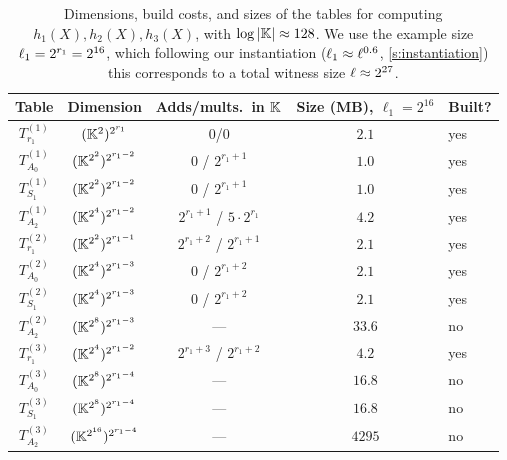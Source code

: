 \documentclass[11pt,letterpaper,usenames,dvipsnames]{article}
\begin{document}
\begin{table}[H]
    \centering
    \small
    \begin{tabular}{c|c|c|c|l}
        Table & Dimension & Adds/mults.\ in $\mathbb{K}$ & Size (MB), $\ell_1=2^{16}$ & Built? \\
        \hline
        \hline
        $T_{r_1}^{(1)}$ & $(\mathbb{K}^{2})^{2^{r_1}}$ & 0/0 & $2.1$ & yes \\
        \hline
        $T_{A_0}^{(1)}$ & $(\mathbb{K}^{2^{2}})^{2^{r_1-2}}$  &  $0$ / $2^{r_1 +1}$ & $1.0$ & yes \\
        \hline
        $T_{S_1}^{(1)}$ & $(\mathbb{K}^{2^{2}})^{2^{r_1-2}}$  &  $0$ / $2^{r_1 +1}$ & $1.0$ & yes \\
        \hline
        $T_{A_2}^{(1)}$ & $(\mathbb{K}^{2^{4}})^{2^{r_1-2}}$  &  $2^{r_1+1}$ / $5\cdot 2^{r_1}$ & $4.2$ & yes \\
        \hline
        \hline
        $T_{r_1}^{(2)}$ & $(\mathbb{K}^{2^2})^{2^{r_1-1}}$ & $2^{r_1+2}$ / $2^{r_1+1}$ & $2.1$ & yes \\
        \hline
        $T_{A_0}^{(2)}$ & $(\mathbb{K}^{2^{4}})^{2^{r_1-3}}$  &  $0$ / $2^{r_1 +2}$ & $2.1$ & yes \\
        \hline
        $T_{S_1}^{(2)}$ & $(\mathbb{K}^{2^{4}})^{2^{r_1-3}}$  &  $0$ / $2^{r_1 +2}$ & $2.1$ & yes \\
        \hline
        $T_{A_2}^{(2)}$ & $(\mathbb{K}^{2^{8}})^{2^{r_1-3}}$  &  --- & $33.6$ & no  \\
        \hline
        \hline
        $T_{r_1}^{(3)}$ & $(\mathbb{K}^{2^{4}})^{2^{r_1-2}}$  & $2^{r_1+3}$ / $2^{r_1+2}$ & $4.2$ & yes \\
        \hline
        $T_{A_0}^{(3)}$ & $(\mathbb{K}^{2^{8}})^{2^{r_1-4}}$  &  --- & $16.8$ & no \\
        \hline
        $T_{S_1}^{(3)}$ & $(\mathbb{K}^{2^{8}})^{2^{r_1-4}}$  &  --- & $16.8$ & no  \\
        \hline
        $T_{A_2}^{(3)}$ & $(\mathbb{K}^{2^{16}})^{2^{r_1-4}}$  &  --- & $4295$ & no
    \end{tabular}
    \caption{Dimensions, build costs, and sizes of the tables for computing $h_1(X), h_2(X), h_3(X)$, with $\log|\mathbb{K}|\approx 128$. We use the example size $\ell_1=2^{r_1}=2^{16}$, which following our instantiation ($\ell_1\approx \ell^{0.6}$, \cref{s:instantiation}) this corresponds to a total witness size $\ell  \approx 2^{27}$. }
\label{tab:gkr_tables}
\end{table}
\end{document}
